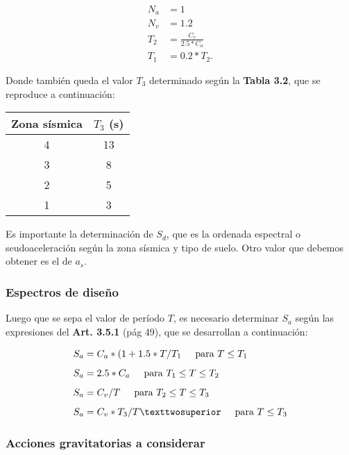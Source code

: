 \documentclass[../main.tex]{subfiles}
\begin{document}
\begin{align*}
  N_a &= 1 \\[5pt]
  N_v &= 1.2 \\[5pt]
  T_2 &= \frac{C_v}{2.5*C_a} \\[5pt]
  T_1 &= 0.2 * T_2
.\end{align*}

Donde también queda el valor $T_3$ determinado según la  \textbf{Tabla 3.2},
que se reproduce a continuación:

\begin{center}
  \begin{tabular}{|c|c|}
    \hline
    \textbf{Zona sísmica} & $T_3$ (s) \\
    \hline
    4 & 13 \\
    \hline
    3 & 8 \\
    \hline
    2 & 5 \\
    \hline
    1 & 3 \\
    \hline
  \end{tabular} 
\end{center}

Es importante la determinación de $S_d$, que es la ordenada espectral o 
seudoaceleración según la zona sísmica y tipo de suelo. Otro valor que debemos
obtener es el de $a_s$.

\subsubsection{Espectros de diseño}

Luego que se sepa el valor de período $T$, es necesario determinar $S_a$ según
las expresiones del  \textbf{Art. 3.5.1} (pág 49), que se desarrollan a
continuación:

\begin{align*}
  S_a &= C_a * (1 + 1.5 * T / T_1  \hspace{0.5cm} \text{para } T \leq T_1\\[5pt]
  S_a &= 2.5*C_a  \hspace{0.5cm} \text{para } T_1 \leq T \leq T_2  \\[5pt]
  S_a &= C_v / T  \hspace{0.5cm} \text{para } T_2 \leq T \leq T_3  \\[5pt]
  S_a &= C_v * T_3 /T² \hspace{0.5cm} \text{para } T \leq T_3 
\end{align*}


\subsubsection{Acciones gravitatorias a considerar}
\end{document}
